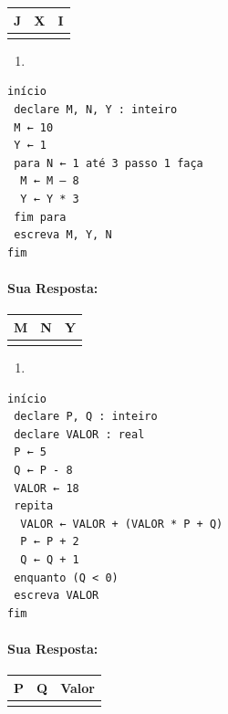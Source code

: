\documentclass[12pt,a4paper]{article}
\providecommand{\tightlist}{%
      \setlength{\itemsep}{0pt}\setlength{\parskip}{0pt}}
\begin{document}
\begin{longtable}[]{@{}ccc@{}}
\toprule()
J & X & I \\
\midrule()
\endhead
& & \\
\bottomrule()
\end{longtable}

    \begin{enumerate}
\def\labelenumi{\alph{enumi})}
\setcounter{enumi}{3}
\tightlist
\item
\end{enumerate}

\begin{verbatim}
início
 declare M, N, Y : inteiro
 M ← 10
 Y ← 1
 para N ← 1 até 3 passo 1 faça
  M ← M – 8
  Y ← Y * 3
 fim para
 escreva M, Y, N
fim 
\end{verbatim}

    \hypertarget{sua-resposta}{%
\paragraph{Sua Resposta:}\label{sua-resposta}}

\begin{longtable}[]{@{}ccc@{}}
\toprule()
M & N & Y \\
\midrule()
\endhead
& & \\
\bottomrule()
\end{longtable}

    \begin{enumerate}
\def\labelenumi{\alph{enumi})}
\setcounter{enumi}{4}
\tightlist
\item
\end{enumerate}

\begin{verbatim}
início
 declare P, Q : inteiro
 declare VALOR : real
 P ← 5
 Q ← P - 8
 VALOR ← 18
 repita
  VALOR ← VALOR + (VALOR * P + Q)
  P ← P + 2
  Q ← Q + 1
 enquanto (Q < 0)
 escreva VALOR
fim 
\end{verbatim}

    \hypertarget{sua-resposta}{%
\paragraph{Sua Resposta:}\label{sua-resposta}}

\begin{longtable}[]{@{}ccc@{}}
\toprule()
P & Q & Valor \\
\midrule()
\endhead
& & \\
\bottomrule()
\end{longtable}
\end{document}
